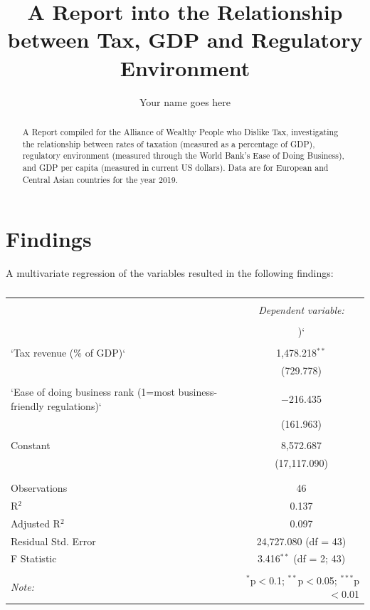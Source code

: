 \documentclass[]{report}
\title{A Report into the Relationship between Tax, GDP and Regulatory Environment}
\author{Your name goes here}
\begin{document}
\maketitle

\begin{abstract}
A Report compiled for the Alliance of Wealthy People who Dislike Tax, investigating the relationship between rates of taxation (measured as a percentage of GDP), regulatory environment (measured through the World Bank's Ease of Doing Business), and GDP per capita (measured in current US dollars). Data are for European and Central Asian countries for the year 2019.
\end{abstract}

\section{Findings}
A multivariate regression of the variables resulted in the following findings:

\begin{table}[!htbp] \centering 
	\caption{} 
	\label{} 
	\begin{tabular}{@{\extracolsep{5pt}}lc} 
		\\[-1.8ex]\hline 
		\hline \\[-1.8ex] 
		& \multicolumn{1}{c}{\textit{Dependent variable:}} \\ 
		\cline{2-2} 
		\\[-1.8ex] & )` \\ 
		\hline \\[-1.8ex] 
		`Tax revenue (\% of GDP)` & 1,478.218$^{**}$ \\ 
		& (729.778) \\ 
		& \\ 
		`Ease of doing business rank (1=most business-friendly regulations)` & $-$216.435 \\ 
		& (161.963) \\ 
		& \\ 
		Constant & 8,572.687 \\ 
		& (17,117.090) \\ 
		& \\ 
		\hline \\[-1.8ex] 
		Observations & 46 \\ 
		R$^{2}$ & 0.137 \\ 
		Adjusted R$^{2}$ & 0.097 \\ 
		Residual Std. Error & 24,727.080 (df = 43) \\ 
		F Statistic & 3.416$^{**}$ (df = 2; 43) \\ 
		\hline 
		\hline \\[-1.8ex] 
		\textit{Note:}  & \multicolumn{1}{r}{$^{*}$p$<$0.1; $^{**}$p$<$0.05; $^{***}$p$<$0.01} \\ 
	\end{tabular} 
\end{table} 
\end{document}
